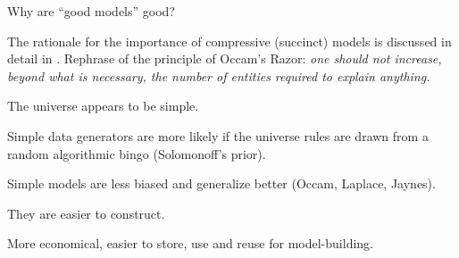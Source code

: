 \begin{frame}[label=ladila]{Why are ``good models'' good?}

The rationale for the importance of compressive (succinct) models is discussed in detail in \cite{Ruffini:2009aa,Ruffini2017}.  Rephrase of the principle of Occam’s Razor: {\em
one should not increase, beyond what is necessary, the number of entities required to explain anything.}  \vfill

The universe appears to be simple.\vfill


Simple data generators are more likely if the universe rules are drawn from a random algorithmic bingo (Solomonoff's prior). \vfill

Simple models are less biased and generalize better (Occam, Laplace, Jaynes). \vfill

They are easier to construct. \vfill

More economical, easier to store, use and reuse for model-building. \vfill



\end{frame}